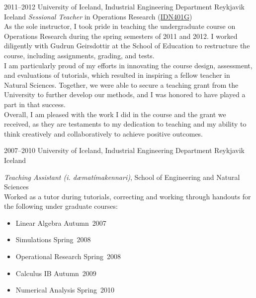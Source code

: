 \documentclass[]{cv} %
\begin{document}
\begin{entrylist}
    \entry
    {2011--2012}
    {University of Iceland, Industrial Engineering Department}
    {Reykjavik Iceland}
    {\emph{Sessional Teacher} in Operations Research (\href{https://ugla.hi.is/kennsluskra/index.php?sid=&tab=nam&chapter=namskeid&id=08213020110}{IDN401G})\\
    As the sole instructor, I took pride in teaching the undergraduate course on Operations Research during the spring semesters of 2011 and 2012. I worked diligently with Gudrun Geirsdottir at the School of Education to restructure the course, including assignments, grading, and tests.\\
    I am particularly proud of my efforts in innovating the course design, assessment, and evaluations of tutorials, which resulted in inspiring a fellow teacher in Natural Sciences. Together, we were able to secure a teaching grant from the University to further develop our methods, and I was honored to have played a part in that success.\\
    Overall, I am pleased with the work I did in the course and the grant we received, as they are testaments to my dedication to teaching and my ability to think creatively and collaboratively to achieve positive outcomes.
    }

    \entry
    {2007--2010}
    {University of Iceland, Industrial Engineering Department}
    {Reykjavik Iceland}
    {\emph{Teaching Assistant (i. dæmatímakennari)}, School of Engineering and 
    Natural Sciences \\
        Worked as a tutor during tutorials, correcting and working through 
        handouts for the following under graduate courses: 
        \begin{itemize}
            \item Linear Algebra 		\hfill Autumn~2007
            \item Simulations			\hfill Spring~2008
            \item Operational Research 	\hfill Spring~2008
            \item Calculus IB			\hfill Autumn~2009
            \item Numerical Analysis 	\hfill Spring~2010
        \end{itemize}	
    }
\end{entrylist}   
\end{document}
